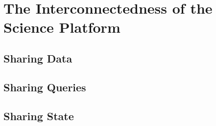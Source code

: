 \section{The Interconnectedness of the Science Platform}\label{interconnectedness-of-the-science-platform}

\subsection{Sharing Data}\label{sharing-data}

\subsection{Sharing Queries}\label{sharing-queries}

\subsection{Sharing State}\label{sharing-state}

